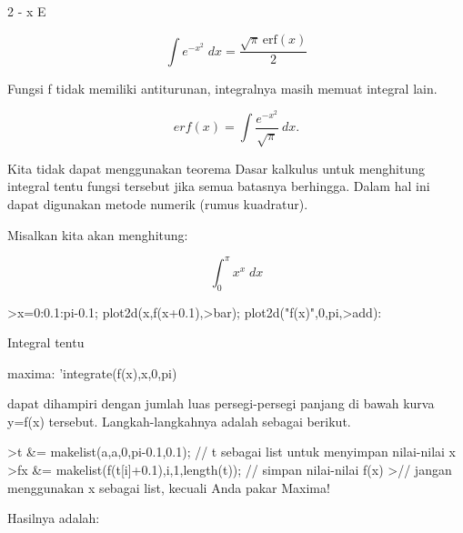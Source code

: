 \documentclass[a4paper,10pt]{article}
\begin{document}
\begin{eulernotebook}
\begin{eulercomment}
\begin{eulercomment}
\begin{eulercomment}
\begin{eulercomment}
\begin{eulercomment}
\begin{eulercomment}
\begin{eulercomment}
\begin{eulercomment}
\begin{euleroutput}
                                      2
                                   - x
                                  E
  
\end{euleroutput}
\begin{eulerformula}
\[
\int {e^ {- x^2 }}{\;dx}=\frac{\sqrt{\pi}\,\mathrm{erf}\left(x  \right)}{2}
\]
\end{eulerformula}
\begin{eulercomment}
Fungsi f tidak memiliki antiturunan, integralnya masih memuat integral
lain.

\end{eulercomment}
\begin{eulerformula}
\[
erf(x) = \int \frac{e^{-x^2}}{\sqrt{\pi}} \ dx.
\]
\end{eulerformula}
\begin{eulercomment}
Kita tidak dapat menggunakan teorema Dasar kalkulus untuk menghitung
integral tentu fungsi tersebut jika semua batasnya berhingga. Dalam
hal ini dapat digunakan metode numerik (rumus kuadratur).

Misalkan kita akan menghitung:

\end{eulercomment}
\begin{eulerformula}
\[
\int_{0}^{\pi}{x^{x}\;dx}
\]
\end{eulerformula}
\begin{eulerprompt}
>x=0:0.1:pi-0.1; plot2d(x,f(x+0.1),>bar); plot2d("f(x)",0,pi,>add):
\end{eulerprompt}
\begin{eulercomment}
Integral tentu

maxima: 'integrate(f(x),x,0,pi)

dapat dihampiri dengan jumlah luas persegi-persegi panjang di bawah
kurva y=f(x) tersebut. Langkah-langkahnya adalah sebagai berikut.
\end{eulercomment}
\begin{eulerprompt}
>t &= makelist(a,a,0,pi-0.1,0.1); // t sebagai list untuk menyimpan nilai-nilai x
>fx &= makelist(f(t[i]+0.1),i,1,length(t)); // simpan nilai-nilai f(x)
>// jangan menggunakan x sebagai list, kecuali Anda pakar Maxima!
\end{eulerprompt}
\begin{eulercomment}
Hasilnya adalah:


\end{eulercomment}
\end{eulercomment}
\end{eulercomment}
\end{eulercomment}
\end{eulercomment}
\end{eulercomment}
\end{eulercomment}
\end{eulercomment}
\end{eulercomment}
\end{eulernotebook}
\end{document}
